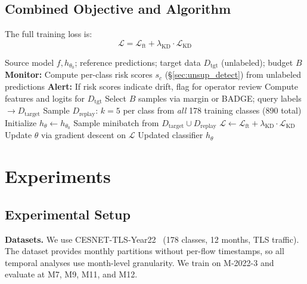\documentclass[journal]{IEEEtran}
\newcommand{\ours}{CARE}  %
\begin{document}
\subsection{Combined Objective and Algorithm}

The full training loss is:
\begin{equation}
  \mathcal{L} = \mathcal{L}_{\text{ft}} + \lambda_{\text{KD}} \cdot \mathcal{L}_{\text{KD}}
\end{equation}

\begin{algorithm}[t]
\caption{\ours{}: Collapse-Aware Active Repair}
\label{alg:care}
\begin{algorithmic}[1]
\REQUIRE Source model $f, h_{\theta_0}$; reference predictions; target data $D_{\text{tgt}}$ (unlabeled); budget $B$
\STATE \textbf{Monitor:} Compute per-class risk scores $s_c$ (\S\ref{sec:unsup_detect}) from unlabeled predictions
\STATE \textbf{Alert:} If risk scores indicate drift, flag for operator review
\STATE Compute features and logits for $D_{\text{tgt}}$
\STATE Select $B$ samples via margin or BADGE; query labels $\to D_{\text{target}}$
\STATE Sample $D_{\text{replay}}$: $k{=}5$ per class from \textit{all} 178 training classes (890 total)
\STATE Initialize $h_\theta \leftarrow h_{\theta_0}$
  \STATE Sample minibatch from $D_{\text{target}} \cup D_{\text{replay}}$
  \STATE $\mathcal{L} \leftarrow \mathcal{L}_{\text{ft}} + \lambda_{\text{KD}} \cdot \mathcal{L}_{\text{KD}}$
  \STATE Update $\theta$ via gradient descent on $\mathcal{L}$
\ENDFOR
\RETURN Updated classifier $h_\theta$
\end{algorithmic}
\end{algorithm}


\section{Experiments}
\label{sec:experiments}

\subsection{Experimental Setup}
\label{sec:exp_setup}

\textbf{Datasets.}
We use CESNET-TLS-Year22~\cite{hynek2024cesnet} (178 classes, 12 months, TLS traffic).
The dataset provides monthly partitions without per-flow timestamps, so all temporal analyses use month-level granularity.
We train on M-2022-3 and evaluate at M7, M9, M11, and M12.
\end{document}
